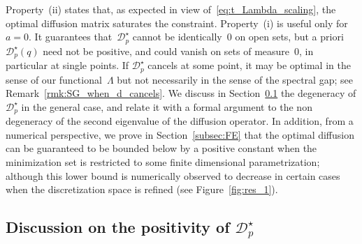 \documentclass{article}
\newcommand{\Diff}{\mathcal{D}}
\renewcommand{\dim}{d}
\begin{document}
Property~(ii) states that, as expected in view of~\eqref{eq:t_Lambda_scaling}, the optimal diffusion matrix saturates the constraint. Property~(i) is useful only for~$a=0$. It guarantees that~$\Diff^{\star}_p$ cannot be identically~0 on open sets, but a priori~$\Diff^{\star}_p(q)$ need not be positive, and could vanish on sets of measure~0, in particular at single points. If $\Diff^{\star}_p$ cancels at some point, it may be optimal in the sense of our functional~$\Lambda$ but not necessarily in the sense of the spectral gap; see Remark~\ref{rmk:SG_when_\dim_cancels}. We discuss in Section~\ref{subsec:euler-lagrange} the degeneracy of $\Diff^{\star}_p$ in the general case, and relate it with a formal argument to the non degeneracy of the second eigenvalue of the diffusion operator. In addition, from a numerical perspective, we prove in Section~\ref{subsec:FE} that the optimal diffusion can be guaranteed to be bounded below by a positive constant when the minimization set is restricted to some finite dimensional parametrization; although this lower bound is numerically observed to decrease in certain cases when the discretization space is refined (see Figure~\ref{fig:res_1}). 

\subsection{Discussion on the positivity of $\Diff^{\star}_p$}
\label{subsec:euler-lagrange}
\end{document}
